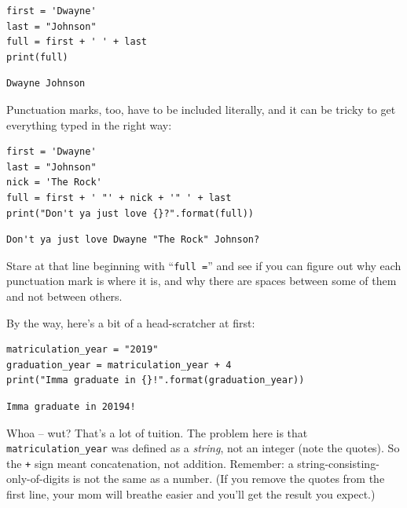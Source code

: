 \begin{Verbatim}[fontsize=\small,samepage=true,frame=single,framesep=3mm]
first = 'Dwayne'
last = "Johnson"
full = first + ' ' + last
print(full)
\end{Verbatim}

\begin{Verbatim}[fontsize=\small,samepage=true,frame=leftline,framesep=5mm,framerule=1mm]
Dwayne Johnson
\end{Verbatim}

Punctuation marks, too, have to be included literally, and it can be tricky to
get everything typed in the right way:

\begin{Verbatim}[fontsize=\small,samepage=true,frame=single,framesep=3mm]
first = 'Dwayne'
last = "Johnson"
nick = 'The Rock'
full = first + ' "' + nick + '" ' + last
print("Don't ya just love {}?".format(full))
\end{Verbatim}

\begin{Verbatim}[fontsize=\small,samepage=true,frame=leftline,framesep=5mm,framerule=1mm]
Don't ya just love Dwayne "The Rock" Johnson?
\end{Verbatim}

Stare at that line beginning with ``\texttt{full =}'' and see if you can figure
out why each punctuation mark is where it is, and why there are spaces between
some of them and not between others.

By the way, here's a bit of a head-scratcher at first:

\begin{Verbatim}[fontsize=\small,samepage=true,frame=single,framesep=3mm]
matriculation_year = "2019"
graduation_year = matriculation_year + 4
print("Imma graduate in {}!".format(graduation_year))
\end{Verbatim}

\begin{Verbatim}[fontsize=\small,samepage=true,frame=leftline,framesep=5mm,framerule=1mm]
Imma graduate in 20194!
\end{Verbatim}

Whoa -- wut? That's a lot of tuition. The problem here is that
\texttt{matriculation\_year} was defined as a \textit{string}, not an integer
(note the quotes). So the \texttt{+} sign meant concatenation, not addition.
Remember: a string-consisting-only-of-digits is not the same as a number. (If
you remove the quotes from the first line, your mom will breathe easier and
you'll get the result you expect.)


